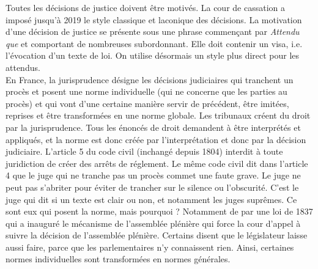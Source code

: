 \documentclass[math]{cours}
\begin{document}
	Toutes les décisions de justice doivent être motivés. La cour de cassation a imposé jusqu'à 2019 le style classique et laconique des décisions.
	La motivation d'une décision de justice se présente sous une phrase commençant par \textit{Attendu que} et comportant de nombreuses subordonnant.
	Elle doit contenir un visa, i.e. l'évocation d'un texte de loi.
	On utilise désormais un style plus direct pour les attendus. \\
	En France, la jurisprudence désigne les décisions judiciaires qui tranchent un procès et posent une norme individuelle (qui ne concerne que les parties au procès) et qui vont d'une certaine manière servir de précédent, être imitées, reprises et être transformées en une norme globale.
	Les tribunaux créent du droit par la jurisprudence.
	Tous les énoncés de droit demandent à être interprétés et appliqués, et la norme est donc créée par l'interprétation et donc par la décision judiciaire.
	L'article 5 du code civil (inchangé depuis 1804) interdit à toute juridiction de créer des arrêts de réglement.
	Le même code civil dit dans l'article 4 que le juge qui ne tranche pas un procès commet une faute grave.
	Le juge ne peut pas s'abriter pour éviter de trancher sur le silence ou l'obscurité.
	C'est le juge qui dit si un texte est clair ou non, et notamment les juges suprêmes. Ce sont eux qui posent la norme, mais pourquoi ?
	Notamment de par une loi de 1837 qui a inauguré le mécanisme de l'assemblée plénière qui force la cour d'appel à suivre la décision de l'assemblée plénière.
	Certains disent que le législateur laisse aussi faire, parce que les parlementaires n'y connaissent rien.
	Ainsi, certaines normes individuelles sont transformées en normes générales.

\end{document}
